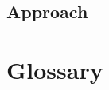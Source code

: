 \documentclass{grantplate}
\begin{document}

\cleardoublepage


\cleardoublepage
\begin{multicols}{2}



\section{Approach}





\end{multicols}

\clearpage
\section*{Glossary}
\printglossaries

\clearpage
\printbibliography
\end{document}
